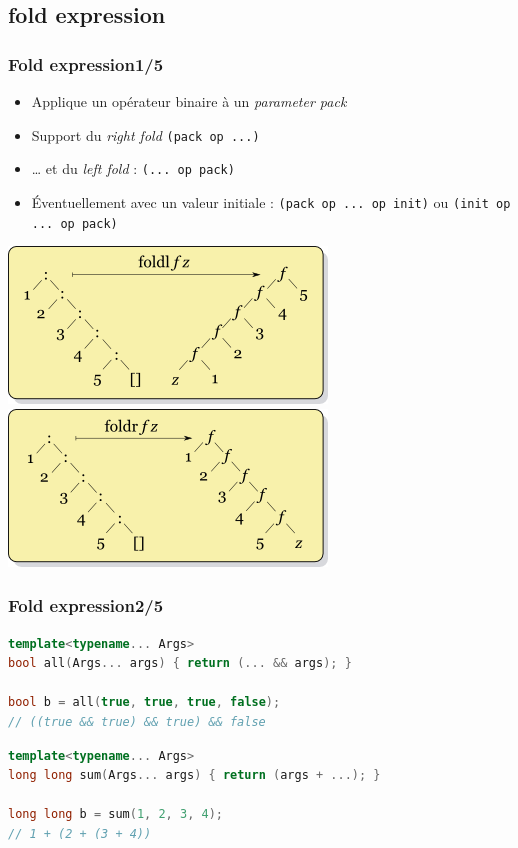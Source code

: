 \documentclass[C++.tex]{subfiles}
\begin{document}
\subsection*{fold expression}
\begin{frame}[fragile]
	\frametitle{Fold expression\titlehfill{}1/5}
	\begin{itemize}
		\item Applique un opérateur binaire à un \textit{parameter pack}
		\item Support du \textit{right fold} \lstinline|(pack op ...)|
		\item \ldots{} et du \textit{left fold} : \lstinline|(... op pack)|
		\item Éventuellement avec un valeur initiale : \lstinline|(pack op ... op init)| ou \lstinline|(init op ... op pack)|
	\end{itemize}

	\begin{center}
		\includegraphics[height=0.30\textheight]{input_src/Left-fold-transformation.png} \includegraphics[height=0.30\textheight]{input_src/Right-fold-transformation.png}
	\end{center}
\end{frame}

\begin{frame}[fragile]
	\frametitle{Fold expression\titlehfill{}2/5}
	\begin{lstlisting}[language=C++]
template<typename... Args>
bool all(Args... args) { return (... && args); }

bool b = all(true, true, true, false);
// ((true && true) && true) && false\end{lstlisting}

	\begin{lstlisting}[language=C++]
template<typename... Args>
long long sum(Args... args) { return (args + ...); }

long long b = sum(1, 2, 3, 4);
// 1 + (2 + (3 + 4))\end{lstlisting}
\end{frame}
\end{document}
